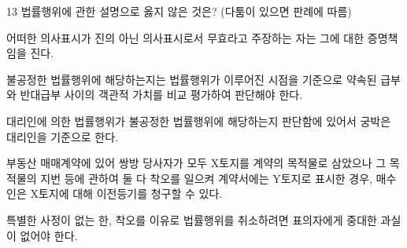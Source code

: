 \begin{question}{13}
법률행위에 관한 설명으로 옳지 않은 것은? (다툼이 있으면 판례에 따름)
\begin{choices}
  \item 어떠한 의사표시가 진의 아닌 의사표시로서 무효라고 주장하는 자는 그에 대한 증명책임을 진다.
  \item 불공정한 법률행위에 해당하는지는 법률행위가 이루어진 시점을 기준으로 약속된 급부와 반대급부 사이의 객관적 가치를 비교 평가하여 판단해야 한다.
  \item 대리인에 의한 법률행위가 불공정한 법률행위에 해당하는지 판단함에 있어서 궁박은 대리인을 기준으로 한다.
  \item 부동산 매매계약에 있어 쌍방 당사자가 모두 X토지를 계약의 목적물로 삼았으나 그 목적물의 지번 등에 관하여 둘 다 착오를 일으켜 계약서에는 Y토지로 표시한 경우, 매수인은 X토지에 대해 이전등기를 청구할 수 있다.
  \item 특별한 사정이 없는 한, 착오를 이유로 법률행위를 취소하려면 표의자에게 중대한 과실이 없어야 한다.
\end{choices}
\end{question}
